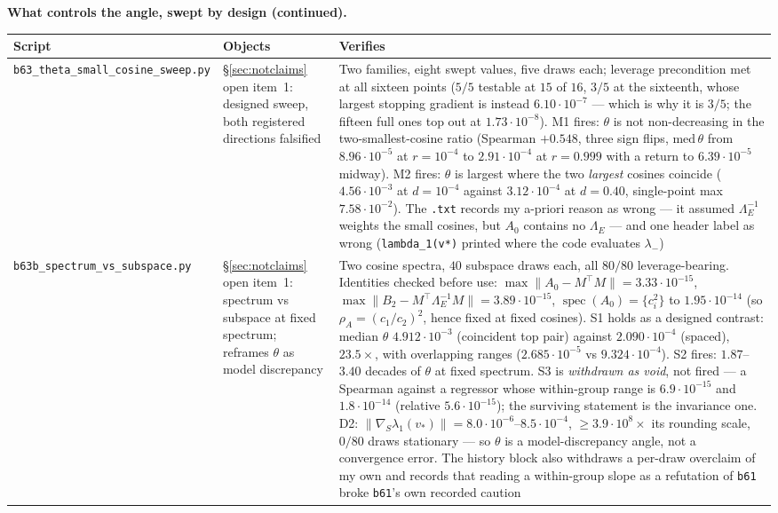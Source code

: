 \documentclass[11pt]{article}
\theoremstyle{remark}
\newcommand{\Le}{\Lambda_E}
\begin{document}
\noindent\textbf{What controls the angle, swept by design (continued).}
\begin{center}\footnotesize\begin{tabular}{@{}>{\raggedright\arraybackslash}p{5.1cm}%
>{\raggedright\arraybackslash}p{2.5cm}>{\raggedright\arraybackslash}p{5.8cm}@{}}
\toprule Script & Objects & Verifies\\
\midrule
\texttt{b63\_theta\_small\_\allowbreak cosine\_sweep.py} & \S\ref{sec:notclaims} open item~1:
designed sweep, both registered directions falsified &
Two families, eight swept values, five draws each; leverage precondition met at all sixteen points
($5/5$ testable at $15$ of $16$, $3/5$ at the sixteenth, whose largest stopping
gradient is instead $6.10\cdot10^{-7}$ --- which is why it is $3/5$; the fifteen full ones top out at
$1.73\cdot10^{-8}$). M1 fires: $\theta$ is not non-decreasing in the two-smallest-cosine ratio (Spearman $+0.548$,
three sign flips, $\mathrm{med}\,\theta$ from $8.96\cdot10^{-5}$ at $r=10^{-4}$ to $2.91\cdot10^{-4}$ at
$r=0.999$ with a return to $6.39\cdot10^{-5}$ midway). M2 fires: $\theta$ is largest where the two
\emph{largest} cosines coincide ($4.56\cdot10^{-3}$ at $d=10^{-4}$ against $3.12\cdot10^{-4}$ at $d=0.40$,
single-point max $7.58\cdot10^{-2}$). The \texttt{.txt} records my a-priori reason as wrong --- it assumed
$\Le^{-1}$ weights the small cosines, but $A_0$ contains no $\Le$ --- and one header label as wrong
(\texttt{lambda\_1(v*)} printed where the code evaluates $\lambda_-$)\\
\texttt{b63b\_spectrum\_vs\_\allowbreak subspace.py} & \S\ref{sec:notclaims} open item~1: spectrum vs
subspace at fixed spectrum; reframes $\theta$ as model discrepancy &
Two cosine spectra, $40$ subspace draws each, all $80/80$ leverage-bearing. Identities checked before use:
$\max\|A_0-M^{\top}M\|=3.33\cdot10^{-15}$, $\max\|B_2-M^{\top}\Le^{-1}M\|=3.89\cdot10^{-15}$,
$\operatorname{spec}(A_0)=\{c_i^2\}$ to $1.95\cdot10^{-14}$ (so $\rho_A=(c_1/c_2)^2$, hence fixed at fixed
cosines). S1 holds as a designed contrast: median $\theta$ $4.912\cdot10^{-3}$ (coincident top pair)
against $2.090\cdot10^{-4}$ (spaced), $23.5\times$, with overlapping ranges
($2.685\cdot10^{-5}$ vs $9.324\cdot10^{-4}$). S2 fires: $1.87$--$3.40$ decades of $\theta$ at fixed
spectrum. S3 is \emph{withdrawn as void}, not fired --- a Spearman against a regressor whose within-group
range is $6.9\cdot10^{-15}$ and $1.8\cdot10^{-14}$ (relative $5.6\cdot10^{-15}$); the surviving statement is the invariance one. D2: $\|\nabla_{\!S}\lambda_1(v_\ast)\|
=8.0\cdot10^{-6}$--$8.5\cdot10^{-4}$, $\ge3.9\cdot10^{8}\times$ its rounding scale, $0/80$ draws
stationary --- so $\theta$ is a model-discrepancy angle, not a convergence error. The history block also
withdraws a per-draw overclaim of my own and records that reading a within-group slope as a refutation
of \texttt{b61} broke \texttt{b61}'s own recorded caution\\
\bottomrule
\end{tabular}\end{center}
\end{document}
